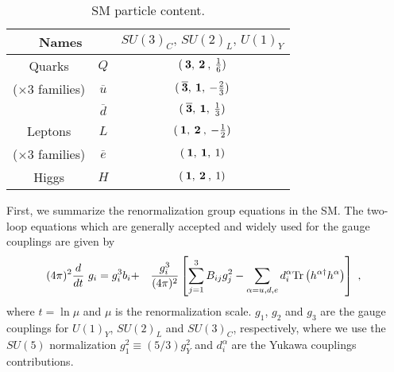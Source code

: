 \documentclass[11pt,prd,superscriptaddress,nofootinbib]{revtex4-1}
\def\sbar{\overline}
\numberwithin{equation}{section}
\begin{document}
\begin{table}[H]
\begin{center}
\begin{tabular}{|c|c|c|}
\hline
\multicolumn{2}{|c|}{Names} 
 & $SU(3)_C ,\, SU(2)_L ,\, U(1)_Y$
\\  \hline\hline
Quarks & $Q$ & $(\>{\bf 3},\>{\bf 2}\>,\>{1\over 6})$
\\
($\times 3$ families) & $\sbar u$ & 
$(\>{\bf \overline 3},\> {\bf 1},\> -{2\over 3})$
\\ & $\sbar d$ & $(\>{\bf \overline 3},\> {\bf 1},\> {1\over 3})$ \\  \hline
Leptons & $L$ & $(\>{\bf 1},\>{\bf 2}\>,\>-{1\over 2})$
\\($\times 3$ families) & $\sbar e$ & $(\>{\bf 1},\> {\bf 1},\>1)$ \\  \hline
Higgs & $H$ & $(\>{\bf 1},\>{\bf 2}\>,\> 1)$
\\  \hline
\end{tabular}
\caption{SM particle content.\label{tab:SM}}
\vspace{-0.6cm}
\end{center}
\end{table}




First, we summarize the renormalization group equations in the SM. The two-loop equations which are generally accepted and widely used for the gauge couplings are given by \cite{Martin:1993zk}
\begin{eqnarray}
(4\pi)^2\frac{d}{dt}~ g_i=g_i^3b_i &+&\frac{g_i^3}{(4\pi)^2}
\left[ \sum_{j=1}^3B_{ij}g_j^2-\sum_{\alpha=u,d,e}d_i^\alpha
{\rm Tr}\left( h^{\alpha \dagger}h^{\alpha}\right) \right] ~,~\,
\label{SMgauge}
\end{eqnarray}
where $t=\ln  \mu$ and $ \mu$ is the renormalization scale.
$g_1$, $g_2$ and $g_3$ are the gauge couplings
for $U(1)_Y$, $SU(2)_L$ and $SU(3)_C$, respectively,
where we use the $SU(5)$ normalization $g_1^2 \equiv (5/3)g_Y^{ 2}$ and $d_i^\alpha$ are the Yukawa couplings contributions.
\end{document}
